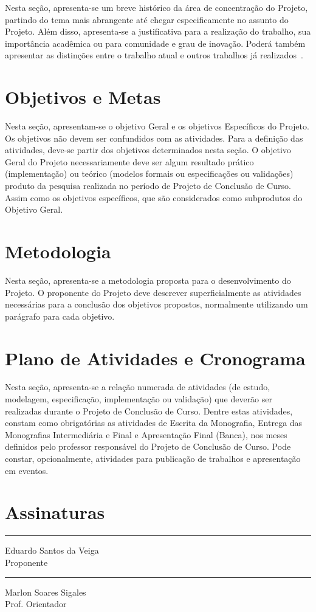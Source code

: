\documentclass[tcc-proposta]{texufpel}
\begin{document}
Nesta seção, apresenta-se um breve histórico da área de concentração
do Projeto, partindo do tema mais abrangente até chegar
especificamente no assunto do Projeto. Além disso, apresenta-se a
justificativa para a realização do trabalho, sua importância acadêmica
ou para comunidade e grau de inovação. Poderá também apresentar as
distinções entre o trabalho atual e outros trabalhos já
realizados~\cite{vonNeumann:1966:TSR}.

\chapter{Objetivos e Metas}
Nesta seção, apresentam-se o objetivo Geral e os objetivos Específicos
do Projeto. Os objetivos não devem ser confundidos com as
atividades. Para a definição das atividades, deve-se partir dos
objetivos determinados nesta seção. O objetivo Geral do Projeto
necessariamente deve ser algum resultado prático (implementação) ou
teórico (modelos formais ou especificações ou validações) produto da
pesquisa realizada no período de Projeto de Conclusão de Curso. Assim
como os objetivos específicos, que são considerados como subprodutos
do Objetivo Geral.

\chapter{Metodologia}
Nesta seção, apresenta-se a metodologia proposta para o
desenvolvimento do Projeto. O proponente do Projeto deve descrever
superficialmente as atividades necessárias para a conclusão dos
objetivos propostos, normalmente utilizando um parágrafo para cada
objetivo.

\chapter{Plano de Atividades e Cronograma}

Nesta seção, apresenta-se a relação numerada de atividades (de estudo,
modelagem, especificação, implementação ou validação) que deverão ser
realizadas durante o Projeto de Conclusão de Curso. Dentre estas
atividades, constam como obrigatórias as atividades de Escrita da
Monografia, Entrega das Monografias Intermediária e Final e
Apresentação Final (Banca), nos meses definidos pelo professor
responsável do Projeto de Conclusão de Curso. Pode constar,
opcionalmente, atividades para publicação de trabalhos e apresentação
em eventos.




\chapter{Assinaturas}
\vspace{2cm}

\begin{center}
\rule{8cm}{.3mm}
\medskip

	Eduardo Santos da Veiga\\
	Proponente

\end{center}

\vspace{4cm}

\begin{center}
\rule{8cm}{.3mm}
\medskip

	Marlon Soares Sigales\\
	Prof. Orientador

\end{center}
\end{document}
